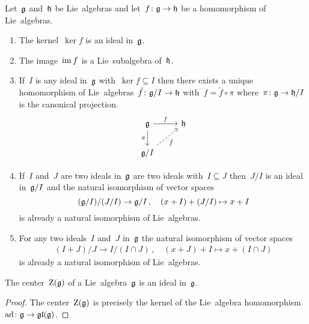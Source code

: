 \begin{proposition}
  Let~$\mathfrak{g}$ and~$\mathfrak{h}$ be Lie~algebras and let~$f \colon \mathfrak{g} \to \mathfrak{h}$ be a homomorphism of Lie~algebras.
  \begin{enumerate}
    \item
      The kernel~$\ker f$ is an ideal in~$\mathfrak{g}$.
    \item
      The image~$\operatorname{im} f$ is a Lie~subalgebra of~$\mathfrak{h}$.
    \item
      If~$I$ is any ideal in~$\mathfrak{g}$ with~$\ker f \subseteq I$ then there exists a unique homomorphism of Lie~algebras~$\tilde{f} \colon \mathfrak{g}/I \to \mathfrak{h}$ with~$f = \tilde{f} \circ \pi$ where~$\pi \colon \mathfrak{g} \to \mathfrak{h}/I$ is the canonical projection.
      \[
        \begin{tikzcd}
          \glie
          \arrow{r}[above]{f}
          \arrow{d}[left]{\pi}
          &
          \hlie
          \\
          \glie/I
          \arrow[dashed]{ur}[below right]{\tilde{f}}
          &
          {}
        \end{tikzcd}
      \]
    \item
      If~$I$ and~$J$ are two ideals in~$\mathfrak{g}$ are two ideals with~$I \subseteq J$ then~$J/I$ is an ideal in~$\mathfrak{g}/I$ and the natural isomorphism of vector spaces
      \[
        (\mathfrak{g}/I) / (J/I)
        \to
        \mathfrak{g}/I \,,
        \quad
        (x+I) + (J/I)
        \mapsto
        x+I
      \]
      is already a natural isomorphism of Lie~algebras.
    \item
      For any two ideals~$I$ and~$J$ in~$\mathfrak{g}$ the natural isomorphism of vector spaces
      \begin{gather*}
        (I + J)/J
        \to
        I/(I \cap J)  \,,
        \quad
        (x+J)+I
        \mapsto
        x + (I \cap J)
      \end{gather*}
      is already a natural isomorphism of Lie~algebras.
  \end{enumerate}
\end{proposition}


\begin{corollary}
  The center~$\operatorname{Z}(\mathfrak{g})$ of a Lie~algebra~$\mathfrak{g}$ is an ideal in~$\mathfrak{g}$.
\end{corollary}


\begin{proof}
  The center~$\operatorname{Z}(\mathfrak{g})$ is precisely the kernel of the Lie~algebra homomorphism~$\operatorname{ad} \colon \mathfrak{g} \to \mathfrak{gl}(\mathfrak{g})$.
\end{proof}


